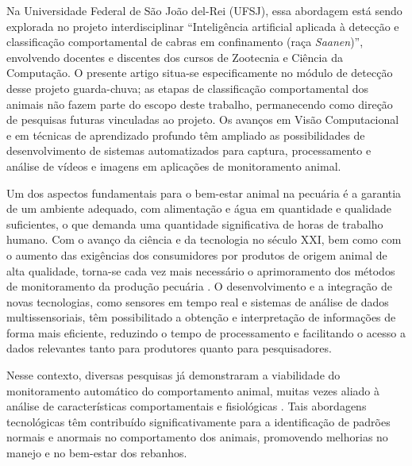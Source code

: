 \documentclass[12pt,fleqn]{article}
\begin{document}
Na Universidade Federal de São João del-Rei (UFSJ), essa abordagem está sendo explorada no projeto interdisciplinar “Inteligência artificial aplicada à detecção e classificação comportamental de cabras em confinamento (raça \textit{Saanen})”, envolvendo docentes e discentes dos cursos de Zootecnia e Ciência da Computação. O presente artigo situa-se especificamente no módulo de detecção desse projeto guarda-chuva; as etapas de classificação comportamental dos animais não fazem parte do escopo deste trabalho, permanecendo como direção de pesquisas futuras vinculadas ao projeto. Os avanços em Visão Computacional e em técnicas de aprendizado profundo têm ampliado as possibilidades de desenvolvimento de sistemas automatizados para captura, processamento e análise de vídeos e imagens em aplicações de monitoramento animal.


Um dos aspectos fundamentais para o bem-estar animal na pecuária é a garantia de um ambiente adequado, com alimentação e água em quantidade e qualidade suficientes, o que demanda uma quantidade significativa de horas de trabalho humano. Com o avanço da ciência e da tecnologia no século XXI, bem como com o aumento das exigências dos consumidores por produtos de origem animal de alta qualidade, torna-se cada vez mais necessário o aprimoramento dos métodos de monitoramento da produção pecuária \citep{dominiak2019, nasirahmadi2017, halachmi2019}. O desenvolvimento e a integração de novas tecnologias, como sensores em tempo real e sistemas de análise de dados multissensoriais, têm possibilitado a obtenção e interpretação de informações de forma mais eficiente, reduzindo o tempo de processamento e facilitando o acesso a dados relevantes tanto para produtores quanto para pesquisadores. 

Nesse contexto, diversas pesquisas já demonstraram a viabilidade do monitoramento automático do comportamento animal, muitas vezes aliado à análise de características comportamentais e fisiológicas \cite{halachmi2019, fogarty2018}. Tais abordagens tecnológicas têm contribuído significativamente para a identificação de padrões normais e anormais no comportamento dos animais, promovendo melhorias no manejo e no bem-estar dos rebanhos.
\end{document}
